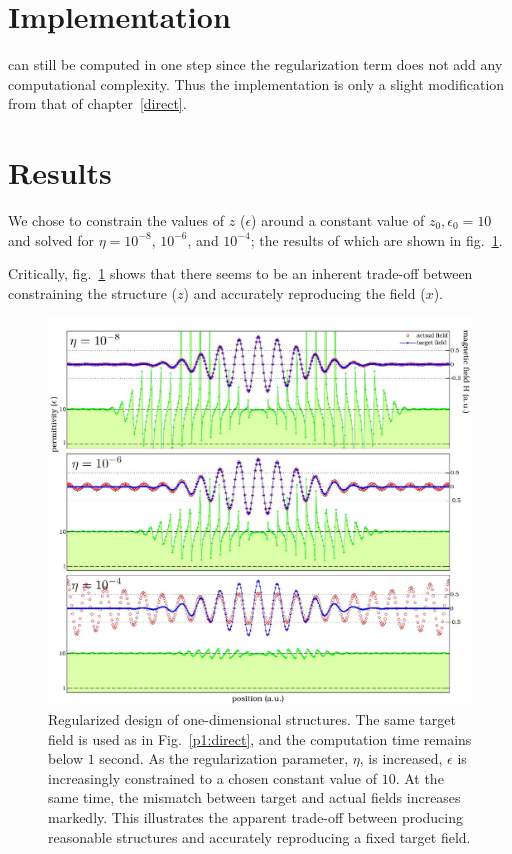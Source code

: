 \section{Implementation}
 can still be computed in one step
    since the regularization term does not add any computational complexity.
Thus the implementation is only a slight modification
    from that of chapter~\ref{direct}.

\section{Results}
We chose to constrain the values of $z$ ($\epsilon$) 
    around a constant value of $z_0, \epsilon_0 = 10$ and 
    solved  for $\eta=10^{-8}$, $10^{-6}$, and $10^{-4}$;
    the results of which are shown in fig.~\ref{regls pic}.
    
Critically, fig.~\ref{regls pic} shows that there seems
    to be an inherent trade-off between 
        constraining the structure ($z$) 
        and accurately reproducing the field ($x$).

\begin{figure}[htbp]\centering
\includegraphics[width=\textwidth]{p1/regularized}
\caption{Regularized design of one-dimensional structures. 
    The same target field is used as in Fig.~\ref{p1:direct}, 
        and the computation time remains below $1$ second. 
    As the regularization parameter, $\eta$, is increased, 
        $\epsilon$ is increasingly constrained to 
        a chosen constant value of $10$. 
    At the same time, the mismatch between target and actual fields 
        increases markedly. 
    This illustrates the apparent trade-off between 
        producing reasonable structures and 
        accurately reproducing a fixed target field.}
\label{regls pic}
\end{figure}




